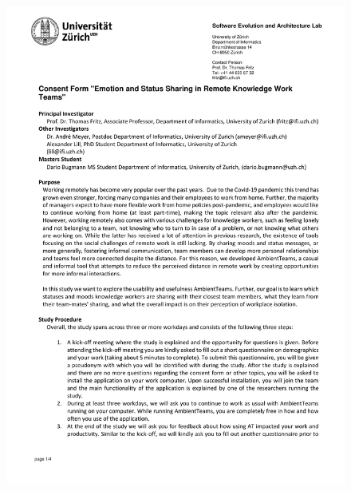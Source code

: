 \begin{figure}[h]
    \centering
    \includegraphics[width=\linewidth, page=3]{./documents/consent_form.pdf}
\end{figure}

